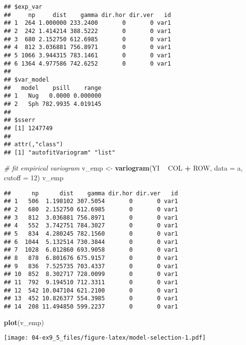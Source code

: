 \documentclass[]{book}
\newenvironment{Shaded}{\begin{snugshade}}{\end{snugshade}}
\newcommand{\CommentTok}[1]{\textcolor[rgb]{0.56,0.35,0.01}{\textit{#1}}}
\newcommand{\DataTypeTok}[1]{\textcolor[rgb]{0.13,0.29,0.53}{#1}}
\newcommand{\DecValTok}[1]{\textcolor[rgb]{0.00,0.00,0.81}{#1}}
\newcommand{\KeywordTok}[1]{\textcolor[rgb]{0.13,0.29,0.53}{\textbf{#1}}}
\newcommand{\NormalTok}[1]{#1}
\newcommand{\OperatorTok}[1]{\textcolor[rgb]{0.81,0.36,0.00}{\textbf{#1}}}
\newcommand{\StringTok}[1]{\textcolor[rgb]{0.31,0.60,0.02}{#1}}
\begin{document}
\begin{verbatim}
## $exp_var
##     np     dist    gamma dir.hor dir.ver   id
## 1  264 1.000000 233.2400       0       0 var1
## 2  242 1.414214 388.5222       0       0 var1
## 3  680 2.152750 612.6985       0       0 var1
## 4  812 3.036881 756.8971       0       0 var1
## 5 1066 3.944315 783.1461       0       0 var1
## 6 1364 4.977586 742.6252       0       0 var1
## 
## $var_model
##   model    psill    range
## 1   Nug   0.0000 0.000000
## 2   Sph 782.9935 4.019145
## 
## $sserr
## [1] 1247749
## 
## attr(,"class")
## [1] "autofitVariogram" "list"
\end{verbatim}

\begin{Shaded}
\begin{Highlighting}[]
\CommentTok{# fit empirical variogram}
\NormalTok{v_emp <-}\StringTok{ }\KeywordTok{variogram}\NormalTok{(YI }\OperatorTok{~}\StringTok{ }\NormalTok{COL }\OperatorTok{+}\StringTok{ }\NormalTok{ROW, }\DataTypeTok{data =}\NormalTok{ a, }\DataTypeTok{cutoff =} \DecValTok{12}\NormalTok{)}
\NormalTok{v_emp}
\end{Highlighting}
\end{Shaded}

\begin{verbatim}
##      np      dist    gamma dir.hor dir.ver   id
## 1   506  1.198102 307.5054       0       0 var1
## 2   680  2.152750 612.6985       0       0 var1
## 3   812  3.036881 756.8971       0       0 var1
## 4   552  3.742751 784.3027       0       0 var1
## 5   834  4.280245 782.1560       0       0 var1
## 6  1044  5.132514 730.3844       0       0 var1
## 7  1028  6.012860 693.9058       0       0 var1
## 8   878  6.801676 675.9157       0       0 var1
## 9   836  7.525735 703.4337       0       0 var1
## 10  852  8.302717 728.0099       0       0 var1
## 11  792  9.194510 712.3311       0       0 var1
## 12  542 10.047104 621.2100       0       0 var1
## 13  452 10.826377 554.3985       0       0 var1
## 14  208 11.494850 599.2237       0       0 var1
\end{verbatim}

\begin{Shaded}
\begin{Highlighting}[]
\KeywordTok{plot}\NormalTok{(v_emp)}
\end{Highlighting}
\end{Shaded}

\texttt{[image: 04-ex9\_5\_files/figure-latex/model-selection-1.pdf]}
\end{document}
